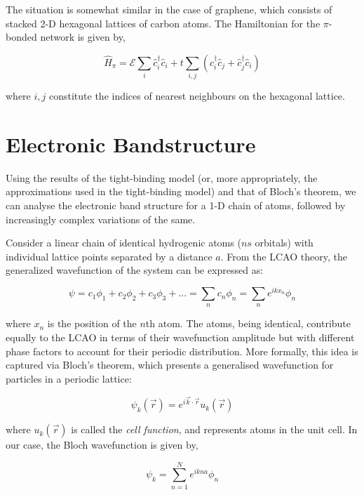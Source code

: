\documentclass{resonance}
\begin{document}
The situation is somewhat similar in the case of graphene, which consists of stacked 2-D hexagonal lattices of carbon atoms. The Hamiltonian for the $\pi$-bonded network is given by,

\begin{equation}
    \hat{H}_{\pi} = \mathcal{E}\sum_{i}\hat{c}_{i}^{\dagger} \hat{c}_{i} + t\sum_{i,j} (\hat{c}_{i}^{\dagger} \hat{c}_{j} + \hat{c}_{j}^{\dagger} \hat{c}_{i})
\end{equation}

where $i, j$ constitute the indices of nearest neighbours on the hexagonal lattice. 


\section{Electronic Bandstructure}

Using the results of the tight-binding model (or, more appropriately, the approximations used in the tight-binding model) and that of Bloch's theorem, we can analyse the electronic band structure for a 1-D chain of atoms, followed by increasingly complex variations of the same. \par
Consider a linear chain of identical hydrogenic atoms ($ns$ orbitals) with individual lattice points separated by a distance $a$. From the LCAO theory, the generalized wavefunction of the system can be expressed as:

\begin{equation}
    \psi = c_{1}\phi_{1} + c_{2}\phi_{2} + c_{3}\phi_{3} + ... = \sum_{n}c_{n}\phi_{n} = \sum_{n}e^{ikx_{n}}\phi_{n}
\end{equation}

where $x_{n}$ is the position of the $n$th atom. The atoms, being identical, contribute equally to the LCAO in terms of their wavefunction amplitude but with different phase factors to account for their periodic distribution. More formally, this idea is captured via Bloch's theorem, which presents a generalised wavefunction for particles in a periodic lattice:

\begin{equation}
    \psi_{k}(\vec{r}) = e^{i\vec{k}\cdot \vec{r}}u_{k}(\vec{r})
\end{equation}

where $u_{k}(\vec{r})$ is called the \textit{cell function}, and represents atoms in the unit cell. In our case, the Bloch wavefunction is given by,

\begin{equation}
    \psi_{k} = \sum_{n=1}^{N} e^{ikna}\phi_{n}
\end{equation}
\end{document}
